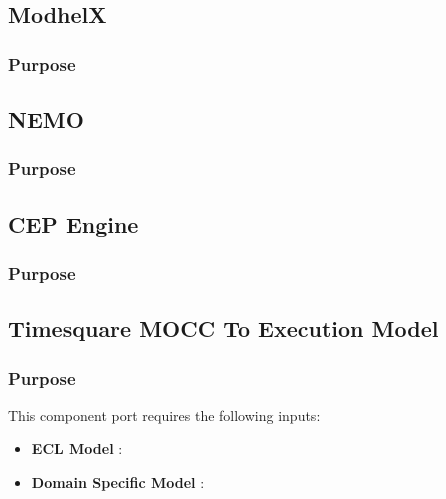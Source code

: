 \documentclass{gemoc} %
\begin{document}
\subsection{ModhelX}


\subsubsection{Purpose}



\subsection{NEMO}


\subsubsection{Purpose}



\subsection{CEP Engine}


\subsubsection{Purpose}



\subsection{Timesquare MOCC To Execution Model}


\subsubsection{Purpose}

This component port requires the following inputs:
\begin{itemize}
  \item \textbf{ECL Model} :
  \item \textbf{Domain Specific Model} :
\end{itemize}
\end{document}
